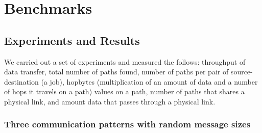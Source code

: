 \section{Benchmarks}
\label{sec:benchmark}





%



\subsection{Experiments and Results}

We carried out a set of experiments and measured the follows: throughput of data transfer, total number of paths found, number of paths per pair of source-destination (a job), hopbytes (multiplication of an amount of data and a number of hops it travels on a path) values on a path, number of paths that shares a physical link, and amount data that passes through a physical link.



\subsubsection {Three communication patterns with random message sizes}


%
